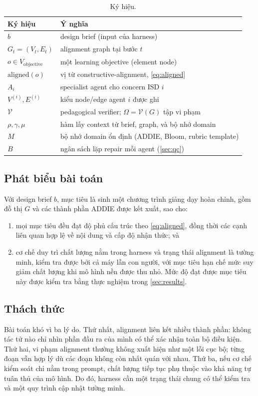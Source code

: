 \begin{table}[t]
  \caption{Ký hiệu.}
  \label{tab:notation}
  \small
  \begin{tabular}{@{}ll@{}}
    \toprule
    Ký hiệu & Ý nghĩa \\
    \midrule
    $b$ & design brief (input của harness) \\
    $G_t=(V_t,E_t)$ & alignment graph tại bước $t$ \\
    $o \in V_{\mathrm{objective}}$ & một learning objective (element node) \\
    $\mathrm{aligned}(o)$ & vị từ constructive-alignment, \cref{eq:aligned} \\
    $A_i$ & specialist agent cho concern ISD $i$ \\
    $V^{(i)},E^{(i)}$ & kiểu node/edge agent $i$ được ghi \\
    $\mathcal{V}$ & pedagogical verifier; $\Omega=\mathcal{V}(G)$ tập vi phạm \\
    $\rho,\gamma,\mu$ & hàm lấy context từ brief, graph, và bộ nhớ domain \\
    $M$ & bộ nhớ domain ổn định (ADDIE, Bloom, rubric template) \\
    $B$ & ngân sách lặp repair mỗi agent (\cref{sec:qc}) \\
    \bottomrule
  \end{tabular}
\end{table}

\subsection{Phát biểu bài toán}
\label{sec:problem-statement}

Với design brief $b$, mục tiêu là sinh một chương trình giảng dạy hoàn chỉnh, gồm đồ thị
$G$ và các thành phần ADDIE được kết xuất, sao cho:
\begin{enumerate}
  \item[(i)] mọi mục tiêu đều đạt độ phủ cấu trúc theo \cref{eq:aligned}, đồng thời
  các cạnh liên quan hợp lệ về nội dung và cấp độ nhận thức; và
  \item[(ii)] cơ chế duy trì chất lượng nằm trong harness và trạng thái alignment là
  tường minh, kiểm tra được bởi cả máy lẫn con người, với mục tiêu hạn chế mức suy giảm
  chất lượng khi mô hình nền được thu nhỏ. Mức độ đạt được mục tiêu này được kiểm tra
  bằng thực nghiệm trong \cref{sec:results}.
\end{enumerate}

\subsection{Thách thức}
\label{sec:challenges}

Bài toán khó vì ba lý do. Thứ nhất, alignment liên kết nhiều thành phần: không tác tử
nào chỉ nhìn phần đầu ra của mình có thể xác nhận toàn bộ điều kiện. Thứ hai, vi phạm
alignment thường không xuất hiện như một lỗi cục bộ; từng đoạn vẫn hợp lý dù các đoạn
không còn nhất quán với nhau. Thứ ba, nếu cơ chế kiểm soát chỉ nằm trong prompt, chất
lượng tiếp tục phụ thuộc vào khả năng tự tuân thủ của mô hình. Do đó, harness cần một
trạng thái chung có thể kiểm tra và một quy trình cập nhật tường minh.
